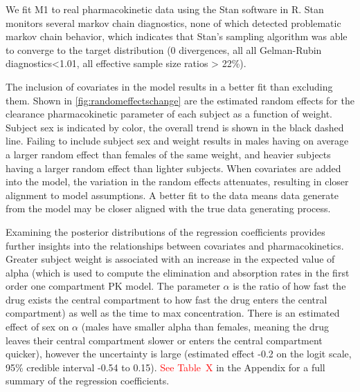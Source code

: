 We fit M1 to real pharmacokinetic data using the Stan software in R\cite{}.  Stan monitors several markov chain diagnostics, none of which detected problematic markov chain behavior, which indicates that Stan’s sampling algorithm was able to converge to the target distribution (0 divergences, all all Gelman-Rubin diagnostics<1.01, all effective sample size ratios  > 22\%).  

The inclusion of covariates in the model results in a better fit than excluding them. Shown in \cref{fig:randomeffectschange} are the estimated random effects for the clearance pharmacokinetic parameter of each subject as a function of weight.  Subject sex is indicated by color, the overall trend is shown in the black dashed line.  Failing to include subject sex and weight results in males having on average a larger random effect than females of the same weight, and heavier subjects having a larger random effect than lighter subjects.  When covariates are added into the model, the variation in the random effects attenuates, resulting in closer alignment to model assumptions. A better fit to the data means data generate from the model may be closer aligned with the true data generating process.

Examining the posterior distributions of the regression coefficients provides further insights into the relationships between covariates and pharmacokinetics.  Greater subject weight is associated with an increase in the expected value of alpha (which is used to compute the elimination and absorption rates in the first order one compartment PK model.  The parameter $ \alpha $ is the ratio of how fast the drug exists the central compartment to how fast the drug enters the central compartment) as well as the time to max concentration.  There is an estimated effect of sex on $ \alpha $ (males have smaller alpha than females, meaning the drug leaves their central compartment slower or enters the central compartment quicker), however the uncertainty is large (estimated effect -0.2 on the logit scale, 95\% credible interval -0.54 to 0.15). \textcolor{red}{See Table~X} in the Appendix for a full summary of the regression coefficients.




